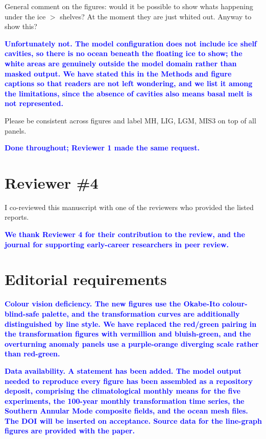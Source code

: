 \documentclass[pdflatex,sn-nature]{sn-jnl}
\begin{document}
\medskip
\noindent General comment on the figures: would it be possible to show whats happening under the ice $>$ shelves? At the moment they are just whited out. Anyway to show this?
\medskip

\noindent\textcolor{blue}{\textbf{Unfortunately not. The model configuration does not include ice shelf cavities, so there is no ocean beneath the floating ice to show; the white areas are genuinely outside the model domain rather than masked output. We have stated this in the Methods and figure captions so that readers are not left wondering, and we list it among the limitations, since the absence of cavities also means basal melt is not represented.}}


\medskip
\noindent Please be consistent across figures and label MH, LIG, LGM, MIS3 on top of all panels.
\medskip

\noindent\textcolor{blue}{\textbf{Done throughout; Reviewer 1 made the same request.}}




\clearpage
\section*{Reviewer \#4}

\medskip
\noindent I co-reviewed this manuscript with one of the reviewers who provided the listed reports.
\medskip

\noindent\textcolor{blue}{\textbf{We thank Reviewer 4 for their contribution to the review, and the journal for supporting early-career researchers in peer review.}}




\clearpage
\section*{Editorial requirements}

\noindent\textcolor{blue}{\textbf{\textbf{Colour vision deficiency.} The new figures use the Okabe-Ito colour-blind-safe palette, and the transformation curves are additionally distinguished by line style. We have replaced the red/green pairing in the transformation figures with vermillion and bluish-green, and the overturning anomaly panels use a purple-orange diverging scale rather than red-green.}}


\noindent\textcolor{blue}{\textbf{\textbf{Data availability.} A statement has been added. The model output needed to reproduce every figure has been assembled as a repository deposit, comprising the climatological monthly means for the five experiments, the 100-year monthly transformation time series, the Southern Annular Mode composite fields, and the ocean mesh files. The DOI will be inserted on acceptance. Source data for the line-graph figures are provided with the paper.}}
\end{document}
